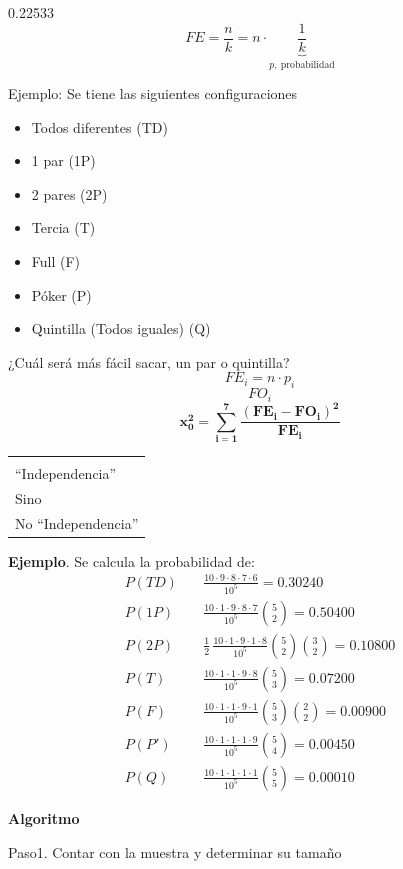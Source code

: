 \documentclass[11pt,letterpaper]{report}
\newenvironment{algoritmo}
  {\begin{center}\begin{tabular}{|p{0.85\textwidth}|}\hline\vspace{-0.2cm}\begin{tabbing}\hspace{0.6cm}\=\hspace{0.6cm}\=\hspace{0.6cm}\=\hspace{0.6cm}\=\hspace{0.6cm}\=\kill}
  {\end{tabbing}\vspace{-0.4cm}\\\hline\end{tabular}\end{center}}
\begin{document}
0.22533
\[
FE = \frac{n}{k} = n \cdot \underbrace{\frac{1}{k}}_{p,\ \text{probabilidad}}
\]

Ejemplo: Se tiene las siguientes configuraciones
\begin{itemize}
\item Todos diferentes (TD)
\item 1 par (1P)
\item 2 pares (2P)
\item Tercia (T)
\item Full (F)
\item Póker (P)
\item Quintilla (Todos iguales) (Q)
\end{itemize}

¿Cuál será más fácil sacar, un par o quintilla?
\[
FE_i = n \cdot p_i
\]
\[
FO_i
\]
\[
\boldsymbol{x_0^2 = \sum_{i=1}^{7} \frac{(FE_i - FO_i)^2}{FE_i}}
\]

\begin{algoritmo}
\>Si( $\sum_{i=1}^{7}\frac{(FE_i - FO_i)^2}{FE_i} < x_{\alpha,k-1}^2$ )\\
\>\>``Independencia''\\
\>Sino\\
\>\>No ``Independencia''
\end{algoritmo}

\textbf{Ejemplo}. Se calcula la probabilidad de:
\begin{align*}
P(TD)&\quad \frac{10 \cdot 9 \cdot 8 \cdot 7 \cdot 6}{10^5} = 0.30240\\[0.2cm]
P(1P)&\quad \frac{10 \cdot 1 \cdot 9 \cdot 8 \cdot 7}{10^5}\binom{5}{2} = 0.50400\\[0.2cm]
P(2P)&\quad \frac{1}{2}\,\frac{10 \cdot 1 \cdot 9 \cdot 1 \cdot 8}{10^5}\binom{5}{2}\binom{3}{2} = 0.10800\\[0.2cm]
P(T)&\quad \frac{10 \cdot 1 \cdot 1 \cdot 9 \cdot 8}{10^5}\binom{5}{3} = 0.07200\\[0.2cm]
P(F)&\quad \frac{10 \cdot 1 \cdot 1 \cdot 9 \cdot 1}{10^5}\binom{5}{3}\binom{2}{2} = 0.00900\\[0.2cm]
P(P')&\quad \frac{10 \cdot 1 \cdot 1 \cdot 1 \cdot 9}{10^5}\binom{5}{4} = 0.00450\\[0.2cm]
P(Q)&\quad \frac{10 \cdot 1 \cdot 1 \cdot 1 \cdot 1}{10^5}\binom{5}{5} = 0.00010
\end{align*}

\textbf{Algoritmo}

Paso1. Contar con la muestra y determinar su tamaño
\end{document}
